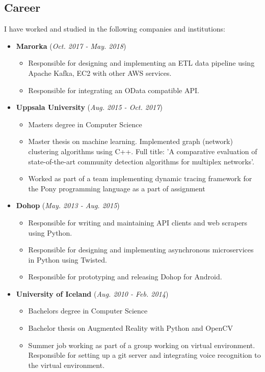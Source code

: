 \documentclass[10pt]{article}
\begin{document}
\begin{flushleft}
\newpage

\section*{Career}
I have worked and studied in the following companies and institutions: \newline

\begin{itemize}
  \item \textbf{Marorka} (\textit{Oct. 2017 - May. 2018})
  \begin{itemize}
  \item Responsible for designing and implementing an ETL data pipeline using Apache Kafka, EC2 with other AWS services.
  \item Responsible for integrating an OData compatible API.
  \end{itemize}
  \item \textbf{Uppsala University} (\textit{Aug. 2015 - Oct. 2017})
  \begin{itemize}
  \item Masters degree in Computer Science
  \item Master thesis on machine learning. Implemented graph (network) clustering algorithms using C++. Full title: 'A comparative evaluation of state-of-the-art community detection algorithms for multiplex networks'. 
  \item Worked as part of a team implementing dynamic tracing framework for the Pony programming language as a part of assignment
  \end{itemize}
  \item \textbf{Dohop} (\textit{May. 2013 - Aug. 2015})
  \begin{itemize}
  \item Responsible for writing and maintaining API clients and web scrapers using Python.
  \item Responsible for designing and implementing asynchronous microservices in Python using Twisted.
  \item Responsible for prototyping and releasing Dohop for Android.
  \end{itemize}
  \item \textbf{University of Iceland} (\textit{Aug. 2010 - Feb. 2014})
  \begin{itemize}
  \item Bachelors degree in Computer Science
  \item Bachelor thesis on Augmented Reality with Python and OpenCV
  \item Summer job working as part of a group working on virtual environment. Responsible for setting up a git server and integrating voice recognition to the virtual environment.
  \end{itemize}
\end{itemize}


\end{flushleft}
\end{document}
